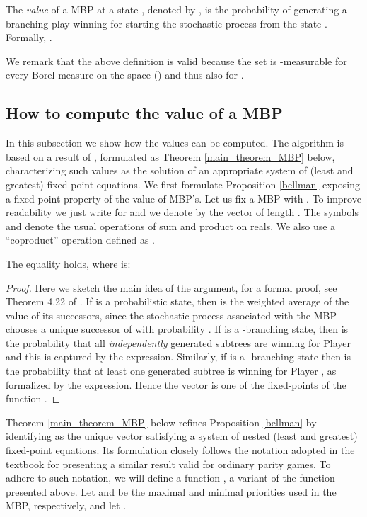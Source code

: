 \begin{definition}
The \emph{value} of a MBP  at a state , denoted by , is the probability of generating a branching play winning for  starting the stochastic process from the state . Formally, .
\end{definition}

We remark that the above definition is valid because the set  is -measurable for every Borel measure  on the space  (\cite{GMMS2014}) and thus also for . 

\subsection{How to compute the value of a MBP}\label{subsection_howto_compute}
In this subsection we show how the values   can be computed. The algorithm is based on a result of \cite{MioThesis,MIO2012b}, formulated as Theorem \ref{main_theorem_MBP} below, characterizing such values as the solution of an appropriate system of (least and greatest) fixed-point equations. We first formulate Proposition \ref{bellman} exposing a fixed-point property of the value of MBP's. Let us fix a MBP  with . 
To improve readability we just write  for  and we denote by  the vector   of length . The symbols  and  denote the usual operations of sum and product on reals. We also use a ``coproduct'' operation defined as  . 


\begin{proposition}\label{bellman}
  The equality  holds, where   is:
\begin{center}

\end{center}
\end{proposition}

\begin{proof} 
Here we sketch the main idea of the argument, for a formal proof, see Theorem 4.22 of \cite{MIO2012b}.
If  is a probabilistic state, then  is the weighted average of the value of its successors, since the stochastic process associated with the MBP chooses a unique successor  of  with probability .  If  is a -branching state, then  is the probability that all \emph{independently} generated subtrees are winning for Player  and this is captured by the  expression. Similarly, if  is a -branching state then  is the probability that at least one generated subtree is winning for Player , as formalized by the  expression.
Hence the vector  is one of the fixed-points of the function .
\end{proof}
Theorem \ref{main_theorem_MBP} below refines Proposition \ref{bellman} by identifying  as the unique vector satisfying a system of nested (least and greatest) fixed-point equations. Its formulation closely follows the notation adopted in the textbook \cite[\S 4.3]{Rudiments2001} for presenting a similar result valid for ordinary parity games. To adhere to such notation, we will define a function , a variant of the function  presented above. Let  and   be the maximal and minimal priorities used in the MBP, respectively, and let . 


